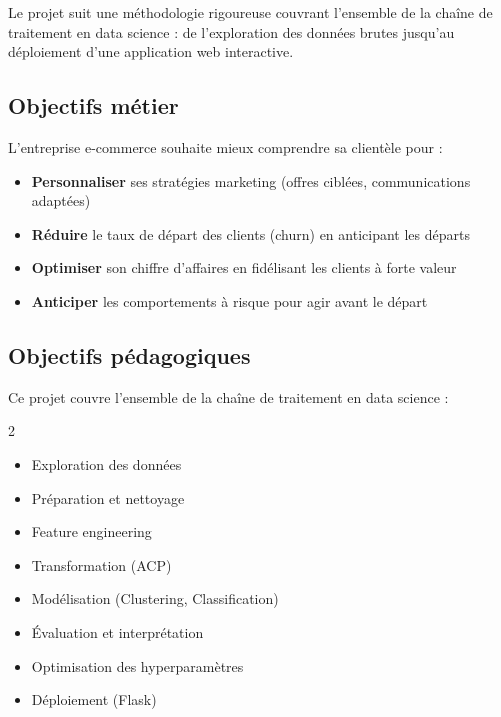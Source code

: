 \documentclass[11pt,a4paper]{article}
\begin{document}
Le projet suit une méthodologie rigoureuse couvrant l'ensemble de la chaîne de traitement 
en data science : de l'exploration des données brutes jusqu'au déploiement d'une application 
web interactive.

\subsection{Objectifs métier}
L'entreprise e-commerce souhaite mieux comprendre sa clientèle pour :
\begin{itemize}[label={\color{headerblue}\textbullet}]
    \item \textbf{Personnaliser} ses stratégies marketing (offres ciblées, communications adaptées)
    \item \textbf{Réduire} le taux de départ des clients (churn) en anticipant les départs
    \item \textbf{Optimiser} son chiffre d'affaires en fidélisant les clients à forte valeur
    \item \textbf{Anticiper} les comportements à risque pour agir avant le départ
\end{itemize}

\subsection{Objectifs pédagogiques}
\begin{tcolorbox}[title=�� Compétences développées]
Ce projet couvre l'ensemble de la chaîne de traitement en data science :
\begin{multicols}{2}
\begin{itemize}
    \item Exploration des données
    \item Préparation et nettoyage
    \item Feature engineering
    \item Transformation (ACP)
    \item Modélisation (Clustering, Classification)
    \item Évaluation et interprétation
    \item Optimisation des hyperparamètres
    \item Déploiement (Flask)
\end{itemize}
\end{multicols}
\end{tcolorbox}
\end{document}

